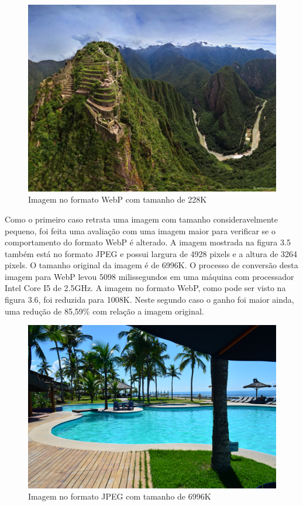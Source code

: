 \documentclass[espaco=simples,appendix=Name]{abnt}
\begin{document}
\begin{figure}[h]
  \centering
    \includegraphics[scale=0.5]{Imagem1WEBP.png}
  \caption{Imagem no formato WebP com tamanho de 228K}
\end{figure}

Como o primeiro caso retrata uma imagem com tamanho consideravelmente pequeno, foi feita uma avaliação com uma imagem maior para verificar se o comportamento do formato WebP é alterado. A imagem mostrada na figura 3.5 também está no formato JPEG e possui largura de 4928 pixels e a altura de 3264 pixels. O tamanho original da imagem é de 6996K. O processo de conversão desta imagem para WebP levou 5098 milissegundos em uma máquina com processador Intel Core I5 de 2.5GHz. A imagem no formato WebP, como pode ser visto na figura 3.6, foi reduzida para 1008K. Neste segundo caso o ganho foi maior ainda, uma redução de 85,59\% com relação a imagem original.

\begin{figure}[h]
  \centering
    \includegraphics[scale=0.5]{Imagem2JPEG.png}
  \caption{Imagem no formato JPEG com tamanho de 6996K}
\end{figure}
\end{document}
